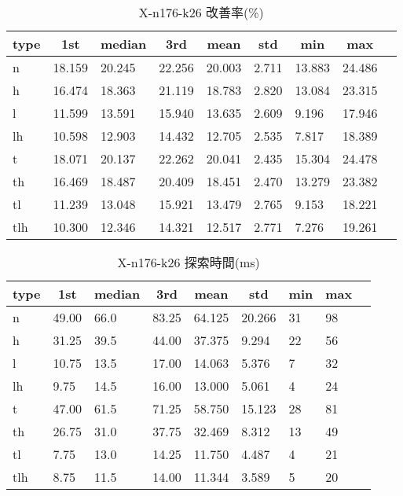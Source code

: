 \begin{table}[htbp]
    \centering
    \caption{X-n176-k26 改善率(\%)}
    \begin{tabular}{|l|l|l|l|l|l|l|l|l|}\hline
    \multicolumn{1}{|c|}{\textbf{type}}
    &\multicolumn{1}{|c|}{\textbf{1st}}
    &\multicolumn{1}{c|}{\textbf{median}}
    &\multicolumn{1}{c|}{\textbf{3rd}}
    &\multicolumn{1}{c|}{\textbf{mean}}
    &\multicolumn{1}{c|}{\textbf{std}}
    &\multicolumn{1}{c|}{\textbf{min}}
    &\multicolumn{1}{c|}{\textbf{max}}\\\hline
	n & 18.159 & 20.245 & 22.256 & 20.003 & 2.711 & 13.883 & 24.486\\\hline
	h & 16.474 & 18.363 & 21.119 & 18.783 & 2.820 & 13.084 & 23.315\\\hline
	l & 11.599 & 13.591 & 15.940 & 13.635 & 2.609 & 9.196 & 17.946\\\hline
	lh & 10.598 & 12.903 & 14.432 & 12.705 & 2.535 & 7.817 & 18.389\\\hline
	t & 18.071 & 20.137 & 22.262 & 20.041 & 2.435 & 15.304 & 24.478\\\hline
	th & 16.469 & 18.487 & 20.409 & 18.451 & 2.470 & 13.279 & 23.382\\\hline
	tl & 11.239 & 13.048 & 15.921 & 13.479 & 2.765 & 9.153 & 18.221\\\hline
	tlh & 10.300 & 12.346 & 14.321 & 12.517 & 2.771 & 7.276 & 19.261\\\hline
	\end{tabular}
\end{table}
\begin{table}[htbp]
    \centering
    \caption{X-n176-k26 探索時間(ms)}
    \begin{tabular}{|l|l|l|l|l|l|l|l|l|}\hline
    \multicolumn{1}{|c|}{\textbf{type}}
    &\multicolumn{1}{|c|}{\textbf{1st}}
    &\multicolumn{1}{c|}{\textbf{median}}
    &\multicolumn{1}{c|}{\textbf{3rd}}
    &\multicolumn{1}{c|}{\textbf{mean}}
    &\multicolumn{1}{c|}{\textbf{std}}
    &\multicolumn{1}{c|}{\textbf{min}}
    &\multicolumn{1}{c|}{\textbf{max}}\\\hline
	n & 49.00 & 66.0 & 83.25 & 64.125 & 20.266 & 31 & 98\\\hline
	h & 31.25 & 39.5 & 44.00 & 37.375 & 9.294 & 22 & 56\\\hline
	l & 10.75 & 13.5 & 17.00 & 14.063 & 5.376 & 7 & 32\\\hline
	lh & 9.75 & 14.5 & 16.00 & 13.000 & 5.061 & 4 & 24\\\hline
	t & 47.00 & 61.5 & 71.25 & 58.750 & 15.123 & 28 & 81\\\hline
	th & 26.75 & 31.0 & 37.75 & 32.469 & 8.312 & 13 & 49\\\hline
	tl & 7.75 & 13.0 & 14.25 & 11.750 & 4.487 & 4 & 21\\\hline
	tlh & 8.75 & 11.5 & 14.00 & 11.344 & 3.589 & 5 & 20\\\hline
	\end{tabular}
\end{table}
